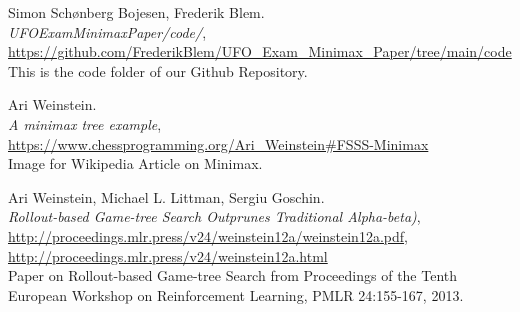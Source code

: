\begin{thebibliography}{1}
    \label{bib:OurCode}
    Simon Schønberg Bojesen, Frederik Blem.\\
    \textit{UFO\textunderscore Exam\textunderscore Minimax\textunderscore Paper/code/}, \url{https://github.com/FrederikBlem/UFO_Exam_Minimax_Paper/tree/main/code}\\
    This is the code folder of our Github Repository.

    \label{bib:AriWeinstein}
    Ari Weinstein.\\
    \textit{A minimax tree example}, \url{https://www.chessprogramming.org/Ari_Weinstein#FSSS-Minimax}\\
    Image for Wikipedia Article on Minimax.

    \label{bib:ArticleFSSSMinimax}
    Ari Weinstein, Michael L. Littman, Sergiu Goschin.\\
    \textit{Rollout-based Game-tree Search Outprunes Traditional Alpha-beta)}, \url{http://proceedings.mlr.press/v24/weinstein12a/weinstein12a.pdf}, \url{http://proceedings.mlr.press/v24/weinstein12a.html}\\
    Paper on Rollout-based Game-tree Search from Proceedings of the Tenth European Workshop on Reinforcement Learning, PMLR 24:155-167, 2013.

    
        
        
        
\end{thebibliography}